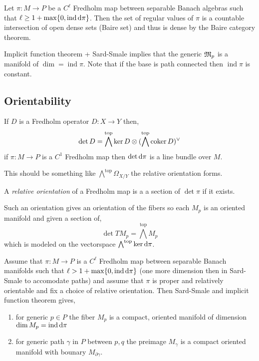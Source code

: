 \documentclass[12pt]{article}
\DeclareMathOperator{\ind}{\mathrm{ind}}
\begin{document}
\begin{thm}
Let $\pi : M \to P$ be a $C^\ell$ Fredholm map between separable Banach algebras such that $\ell \ge 1 + \max \{ 0, \ind{\d{\pi}} \}$. Then the set of regular values of $\pi$ is a countable intersection of open dense sets (Baire set) and thus is dense by the Baire category theorem. 
\end{thm}

\begin{cor}
Implicit function theorem + Sard-Smale implies that the generic $\mathfrak{M}_p$ is a manifold of $\dim = \ind{\pi}$. Note that if the base is path connected then $\ind{\pi}$ is constant. 
\end{cor}

\subsection{Orientability}

If $D$ is a Fredholm operator $D : X \to Y$ then,
\[ \det{D} = \bigwedge^{\mathrm{top}} \ker{D} \otimes (\bigwedge^{\mathrm{top}} \operatorname{\mathrm{coker}}{D})^\vee \]
if $\pi : M \to P$ is a $C^1$ Fredholm map then $\det{\mathrm{d}{\pi}}$ is a line bundle over $M$.

\begin{rmk}
This should be something like $\bigwedge^{\mathrm{top}} \Omega_{X/Y}$ the relative orientation forms.
\end{rmk}

\begin{defn}
A \textit{relative orientation} of a Fredholm map is a a section of $\det{\pi}$ if it exists.
\end{defn}

\begin{rmk}
Such an orientation gives an orientation of the fibers so each $M_p$ is an oriented manifold and given a section of,
\[ \det{TM_p} = \bigwedge^{\mathrm{top}} M_p \]
which is modeled on the vectorspace $\bigwedge^{\mathrm{top}} \ker{\mathrm{d}{\pi}}$. 
\end{rmk}

\begin{cor}
Assume that $\pi : M \to P$ is a $C^\ell$ Fredholm map between separable Banach manifolds such that $\ell > 1 + \max \{ 0, \ind{\d{\pi}} \}$ (one more dimension then in Sard-Smale to accomodate paths) and assume that $\pi$ is proper and relatively orientable and fix a choice of relative orientation. Then Sard-Smale and implicit function theorem gives,
\begin{enumerate}
\item for generic $p \in P$ the fiber $M_p$ is a compact, oriented manifold of dimension $\dim{M_p} = \ind{\d{\pi}}$
\item for generic path $\gamma$ in $P$ between $p, q$ the preimage $M_\gamma$ is a compact oriented manifold with bounary $M_{\partial \gamma}$. 
\end{enumerate}
\end{cor}
\end{document}
